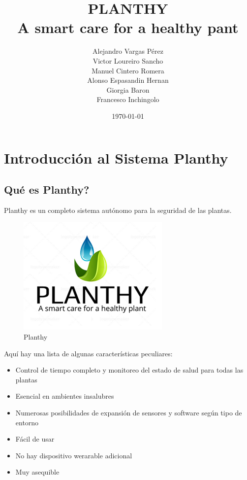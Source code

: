 \documentclass[12pt]{article}
\title{PLANTHY\\ {\large A smart care for a healthy pant}}
\author{Alejandro Vargas Pérez\\
Victor Loureiro Sancho\\
Manuel Cintero Romera\\
Alonso Espasandin Hernan\\
Giorgia Baron\\
Francesco Inchingolo
}
\date{\today}
\begin{document}
\maketitle{}

\tableofcontents

\clearpage
\newpage

\section{Introducción al Sistema Planthy}


\subsection{Qué es Planthy?}
Planthy es un completo sistema autónomo para la seguridad de las plantas. 

\begin{figure}[H]
	\centering
	\includegraphics[scale=1.1]{logo}
	\caption{Planthy}
	\label{fig:planthy}
\end{figure}
Aquí hay una lista de algunas características peculiares:

\begin{itemize}
 \item Control de tiempo completo y monitoreo del estado de salud para todas las plantas
 \item Esencial en ambientes insalubres
 \item Numerosas posibilidades de expansión de sensores y software según tipo de entorno
 \item Fácil de usar
 \item No hay dispositivo werarable adicional
 \item Muy asequible
\end{itemize} 
\end{document}
